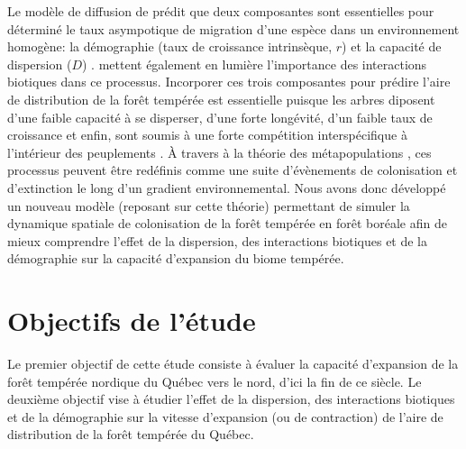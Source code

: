Le modèle de diffusion de \citet{SKELLAM01061951} prédit que deux composantes sont essentielles pour
déterminé le taux asympotique de migration d'une espèce dans un environnement homogène: la
démographie (taux de croissance intrinsèque, $r$) et la capacité de dispersion ($D$) .
\citet{Svenning2014a} mettent également en lumière l'importance des interactions biotiques dans ce
processus. Incorporer ces trois composantes pour prédire l'aire de distribution de la forêt tempérée
est essentielle puisque les arbres diposent d'une faible capacité à se disperser, d'une forte
longévité, d'un faible taux de croissance et enfin, sont soumis à une forte compétition
interspécifique à l'intérieur des peuplements \citep{Renwick2014,Vanderwel2014}. À travers à la
théorie des métapopulations \citep{Levins1969,Holt2000,Holt2005}, ces processus peuvent être
redéfinis comme une suite d'évènements de colonisation et d'extinction le long d'un gradient
environnemental. Nous avons donc développé un nouveau modèle (reposant sur cette théorie)
permettant de simuler la dynamique spatiale de colonisation de la forêt tempérée en forêt boréale
afin de mieux comprendre l'effet de la dispersion, des interactions biotiques et de la démographie
sur la capacité d'expansion du biome tempérée.


\section*{Objectifs de l'étude}

Le premier objectif de cette étude consiste à évaluer la capacité d'expansion de la forêt tempérée nordique du Québec vers le nord, d'ici la fin de ce siècle. Le deuxième objectif vise à
étudier l'effet de la dispersion, des interactions biotiques et de la démographie sur la vitesse
d'expansion (ou de contraction) de l'aire de distribution de la forêt tempérée du Québec.

